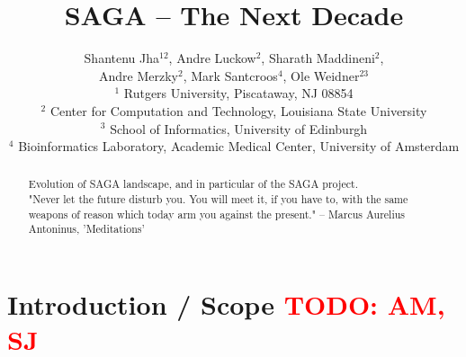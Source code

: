 \documentclass{article}
\newcommand{\B}[1]{\textbf{#1}}
\newcommand{\todo}[1]{{\textcolor{red}{\B{TODO:} #1 }}}
\begin{document}
\title{\large SAGA -- The Next Decade}

\author{
        Shantenu Jha$^{12}$,
        Andre Luckow$^{2}$,
        Sharath Maddineni$^{2}$,\\
        Andre Merzky$^{2}$,
        Mark Santcroos$^{4}$,
        Ole Weidner$^{23}$
        \\[1em]
        $^1$\small
         Rutgers University, 
         Piscataway, NJ 08854\\[-0.3em]
        $^2$ \small
          Center for Computation and Technology, 
          Louisiana State University\\[-0.3em]
        $^3$ \small
          School of Informatics, 
          University of Edinburgh \\[-0.3em]  
        $^4$ \small
         Bioinformatics Laboratory, Academic Medical Center, 
         University of Amsterdam\\[-0.3em]
       }

\maketitle

\begin{abstract}
 Evolution of SAGA landscape, and in particular of the SAGA project.\\

 "Never let the future disturb you. You will meet it, if you have to, 
  with the same weapons of reason which today arm you against the present."
  -- Marcus Aurelius Antoninus, 'Meditations'\\
\end{abstract}

\section{Introduction / Scope \todo{AM, SJ}}
\end{document}
